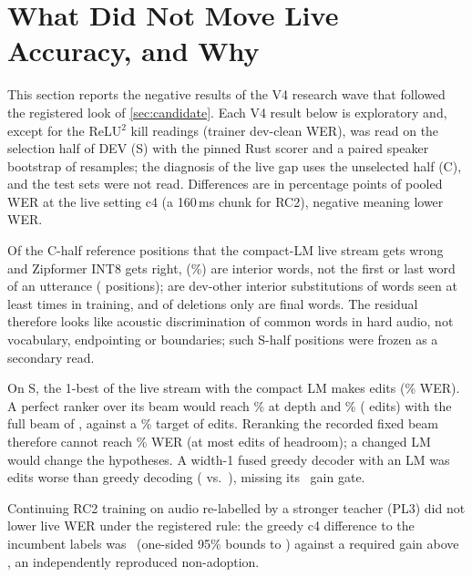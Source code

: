 \section{What Did Not Move Live Accuracy, and Why}\label{sec:v4negative}

This section reports the negative results of the V4 research wave that followed the registered look of \cref{sec:candidate}. Each V4 result below is exploratory and, except for the ReLU$^2$ kill readings (trainer dev-clean WER), was read on the selection half of DEV (S) with the pinned Rust scorer and a paired speaker bootstrap of \VfBootReps{}
resamples; the diagnosis of the live gap uses the unselected half (C), and the test sets were not read. Differences are in percentage points of pooled WER at the live setting c4 (a 160\,ms chunk for RC2), negative meaning lower WER.

 Of the \VfDiagPositions{} C-half reference positions that the compact-LM live stream gets wrong and
Zipformer INT8 gets right, \VfDiagInterior{} (\VfDiagInteriorPct\%) are interior words, not the first or last word of an utterance
(\VfDiagEdge{} positions); \VfDiagFreqOther{} are dev-other interior substitutions of words seen at least \VfFreqMin{} times in training, and
of \VfDelTotal{} deletions only \VfDelLast{} are final words. The residual therefore looks like acoustic discrimination of common words in hard audio, not
vocabulary, endpointing or boundaries; \VfCellCount{} such S-half positions were frozen as a secondary read.

 On S, the 1-best of the live stream with the compact LM makes
\VfOracleOneBestEdits{} edits (\VfOracleOneBestWer\% WER). A perfect ranker over its beam would reach \VfOracleDepthTwoWer\% at depth \VfDepthTwo{}
and \VfOracleDepthFourWer\% (\VfOracleDepthFourEdits{} edits) with the full beam of \VfDepthFour{}, against a
\VfOracleTargetWer\% target of \VfOracleTargetEdits{} edits. Reranking the recorded fixed beam therefore cannot reach \VfOracleTargetWer\% WER (at most \VfOracleSecondaryEdits{}
edits of headroom); a changed LM would change the hypotheses. A width-1 fused greedy decoder with an LM was \VfNineDeltaEdits{} edits worse than greedy
decoding (\VfNineLmEdits{} vs.\ \VfNineGreedyEdits), missing its \VfNineBar\pp\ gain gate.

 Continuing RC2 training on audio re-labelled by a stronger teacher (PL3) did not lower live WER
under the registered rule: the greedy c4 difference to the incumbent labels was \VfPlThreeDelta\pp\ (one-sided 95\% bounds \VfPlThreeLo{}
to \VfPlThreeHi\pp) against a required gain above \VfPlThreeBar\pp, an independently reproduced non-adoption.

